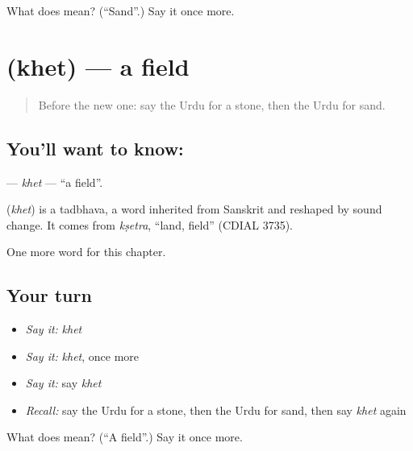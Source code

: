 \begin{tcolorbox}[breakable,colback=teal!4,colframe=teal!35!black,title={Before you move on}]
What does  mean? (\textquotedblleft{}Sand\textquotedblright{}.) Say it once more.
\end{tcolorbox}
\section[\texorpdfstring{\ur{کھیت} (khet)}{کھیت (khet)}]{ (khet) — a field}

\label{lesson:UR-C65-khet}



\begin{quote}
Before the new one: say the Urdu for a stone, then the Urdu for sand.
\end{quote}

\subsection*{You'll want to know: }
\textbf{} — \emph{khet} — \textquotedblleft{}a field\textquotedblright{}.

\begin{cousinweb}
\textbf{} (\emph{khet}) is a tadbhava, a word inherited from Sanskrit and reshaped by sound change. It comes from \emph{kṣetra}, \textquotedblleft{}land, field\textquotedblright{} (CDIAL 3735).
\end{cousinweb}

\begin{grammarlens}[title={What you've built}]
One more word for this chapter.
\end{grammarlens}

\subsection*{Your turn}
\begin{itemize}
\raggedright
  \item \emph{Say it:} \emph{khet}
  \item \emph{Say it:} \emph{khet}, once more
  \item \emph{Say it:} say \emph{khet}
  \item \emph{Recall:} say the Urdu for a stone, then the Urdu for sand, then say \emph{khet} again
\end{itemize}

\begin{tcolorbox}[breakable,colback=teal!4,colframe=teal!35!black,title={Before you move on}]
What does  mean? (\textquotedblleft{}A field\textquotedblright{}.) Say it once more.
\end{tcolorbox}
